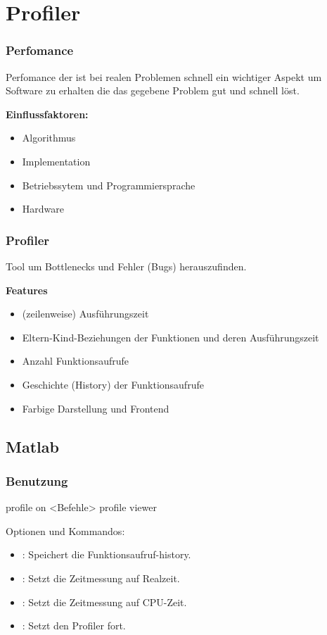 \documentclass[hyperref={xetex}]{beamer}
\begin{document}
\section{Profiler}

\begin{frame}[fragile]\frametitle{Perfomance}

Perfomance der ist bei realen Problemen schnell ein wichtiger Aspekt um Software zu erhalten die das gegebene Problem gut und schnell löst.

\textbf{Einflussfaktoren:}
\begin{itemize}
 \item Algorithmus
 \item \alert{Implementation}
 \item Betriebssytem und Programmiersprache
 \item Hardware
\end{itemize}

\end{frame}

\begin{frame}[fragile]\frametitle{Profiler}
Tool um Bottlenecks und Fehler (Bugs) herauszufinden.

\textbf{Features}
\begin{itemize}
 \item (zeilenweise) Ausführungszeit
\item Eltern-Kind-Beziehungen der Funktionen und deren Ausführungszeit
 \item Anzahl Funktionsaufrufe
\item Geschichte (History) der Funktionsaufrufe
\item Farbige Darstellung und Frontend
\end{itemize}

\end{frame}

\subsection{Matlab}
\begin{frame}[fragile]\frametitle{Benutzung}
\begin{matlabin}
profile on 
<Befehle>
profile viewer
\end{matlabin}
Optionen und Kommandos:
\begin{itemize}
 \item {}: Speichert die Funktionsaufruf-history.
 \item {}: Setzt die Zeitmessung auf Realzeit.
\item {}: Setzt die Zeitmessung auf CPU-Zeit.
 \item {}: Setzt den Profiler fort.
\end{itemize}

\end{frame}
\end{document}
